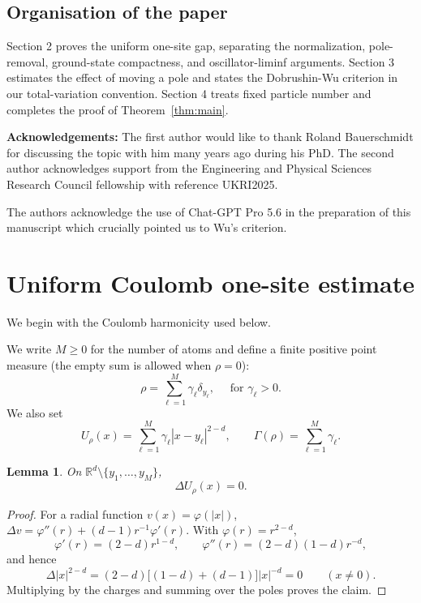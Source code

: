 \documentclass[12pt,reqno,letterpaper]{amsart}
\newtheorem{lemma}[theorem]{Lemma}
\theoremstyle{definition}
\theoremstyle{remark}
\numberwithin{equation}{section}
\newcommand{\R}{\mathbb R}
\begin{document}
\subsection{Organisation of the paper} Section 2 proves the uniform one-site gap, separating the normalization,
pole-removal, ground-state compactness, and oscillator-liminf arguments.
Section 3 estimates the effect of moving a pole and states the Dobrushin-Wu
criterion in our total-variation convention.  Section 4 treats fixed particle
number and completes the proof of Theorem~\ref{thm:main}.

{\bf{Acknowledgements:}} The first author would like to thank Roland Bauerschmidt for discussing the topic with him many years ago during his PhD. The second author  acknowledges support from the Engineering and Physical Sciences Research Council fellowship with reference UKRI2025.

The authors acknowledge the use of Chat-GPT Pro 5.6 in the preparation of this manuscript which crucially pointed us to Wu's criterion.

\section{Uniform Coulomb one-site estimate}\label{sec:target}

We begin with the Coulomb harmonicity used below.

We write $M\ge0$ for the number of atoms and define a finite positive point measure (the empty sum is allowed when \(\rho=0\)):
\begin{equation*}
\rho=\sum_{\ell=1}^M\gamma_\ell\delta_{y_\ell},
 \quad \text{ for } \gamma_\ell>0. \end{equation*} 
 We also set 
 $$ 
 U_{\rho}(x)=\sum_{\ell=1}^M\gamma_\ell|x-y_\ell|^{2-d}, \qquad 
 \Gamma(\rho)=\sum_{\ell=1}^M\gamma_\ell.
$$

\begin{lemma}\label{lem:superharmonic}
On
\(\R^d\setminus\{y_1,\ldots,y_M\}\),
\begin{equation*}
 \Delta U_{\rho}(x)=0.
\end{equation*}
\end{lemma}

\begin{proof}
For a radial function \(v(x)=\varphi(|x|)\),
\(\Delta v=\varphi''(r)+(d-1)r^{-1}\varphi'(r)\).  With
\(\varphi(r)=r^{2-d}\),
\[
 \varphi'(r)=(2-d)r^{1-d},\qquad
 \varphi''(r)=(2-d)(1-d)r^{-d},
\]
and hence
\[
 \Delta|x|^{2-d}
 =(2-d)\bigl[(1-d)+(d-1)\bigr]|x|^{-d}=0
 \qquad(x\ne0).
\]
Multiplying by the charges and summing over the poles proves the claim.
\end{proof}
\end{document}
